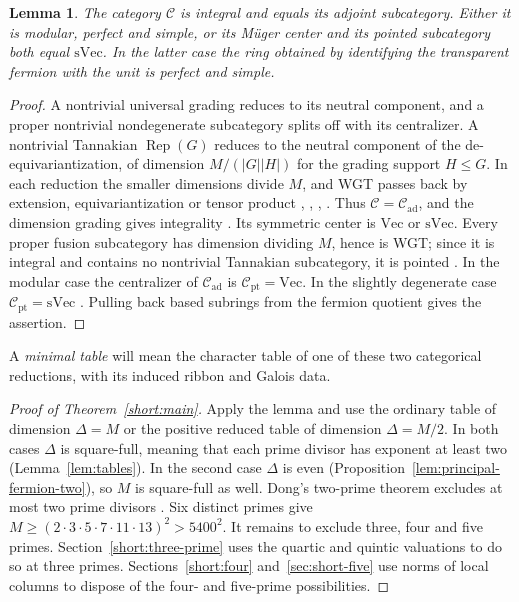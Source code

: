 \documentclass[11pt,a4paper]{article}
\numberwithin{equation}{section}
\newtheorem{lemma}[theorem]{Lemma}
\theoremstyle{remark}
\newcommand{\C}{\mathcal C}
\renewcommand{\Vec}{\mathrm{Vec}}
\newcommand{\Rep}{\operatorname{Rep}}
\newcommand{\ad}{\mathrm{ad}}
\newcommand{\pt}{\mathrm{pt}}
\newcommand{\sVec}{\mathrm{sVec}}
\begin{document}
\begin{lemma}\label{lem:minimal}
The category $\C$ is integral and equals its adjoint subcategory. Either it
is modular, perfect and simple, or its M\"uger center and its pointed
subcategory both equal $\sVec$. In the latter case the ring obtained by
identifying the transparent fermion with the unit is perfect and simple.
\end{lemma}
\begin{proof}
A nontrivial universal grading reduces to its neutral component, and a proper
nontrivial nondegenerate subcategory splits off with its centralizer. A
nontrivial Tannakian $\Rep(G)$ reduces to the neutral component of the
de-equivariantization, of dimension $M/(|G||H|)$ for the grading support
$H\le G$. In each reduction the smaller dimensions divide $M$, and WGT
passes back by extension, equivariantization or tensor product
\cite[Propositions~8.15 and~8.20]{ENOannals},
\cite[Proposition~4.1]{ENOsolvable}, \cite[Theorems~3.13(i) and~4.44, Proposition~4.26]{DGNO},
\cite[Proposition~4.1]{NataleWGT}. Thus $\C=\C_{\ad}$, and the
dimension grading gives integrality \cite[Theorem~3.10]{GNnil}.
Its symmetric center is $\Vec$ or $\sVec$. Every proper fusion
subcategory has dimension dividing $M$, hence is WGT; since it is integral
and contains no nontrivial Tannakian subcategory, it is pointed
\cite[Theorem~3.1]{NataleCore}. In the modular case the centralizer
of $\C_{\ad}$ is $\C_{\pt}=\Vec$. In the slightly degenerate case
$\C_{\pt}=\sVec$ \cite[Lemma~7.1]{NataleWGT}. Pulling back based
subrings from the fermion quotient gives the assertion.
\end{proof}

A \emph{minimal table} will mean the character table of one of these two
categorical reductions, with its induced ribbon and Galois data.

\begin{proof}[Proof of Theorem~\ref{short:main}]
Apply the lemma and use the ordinary table of dimension $\Delta=M$ or the
positive reduced table of dimension $\Delta=M/2$. In both cases $\Delta$
is square-full, meaning that each prime divisor has exponent at least two
(Lemma~\ref{lem:tables}). In the second case $\Delta$ is even
(Proposition~\ref{lem:principal-fermion-two}), so $M$ is square-full as well.
Dong's two-prime theorem excludes at most two prime divisors
\cite[Theorem~3.1]{DongWeakIntegral}. Six distinct primes give
$M\ge(2\cdot3\cdot5\cdot7\cdot11\cdot13)^2>5400^2$.
It remains to exclude three, four and five primes. Section~\ref{short:three-prime}
uses the quartic and quintic valuations to do so at three primes.
Sections~\ref{short:four} and~\ref{sec:short-five} use norms of local
columns to dispose of the four- and five-prime possibilities.
\end{proof}
\end{document}
